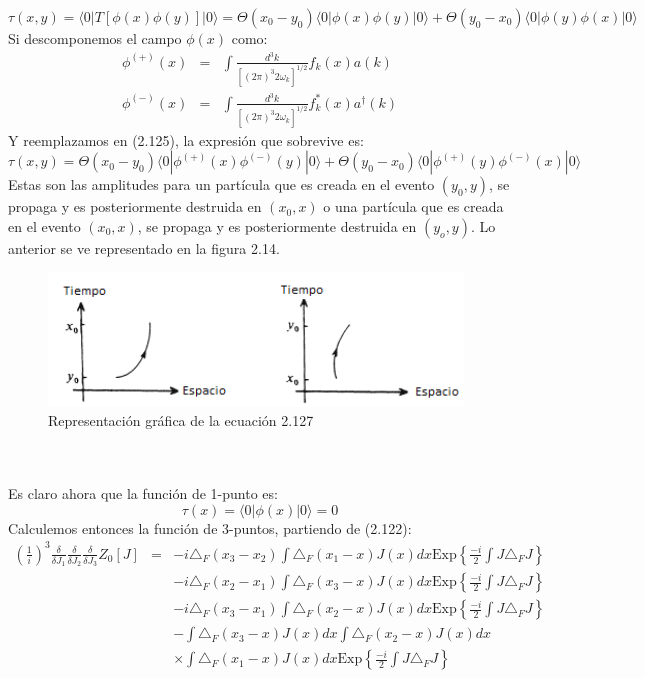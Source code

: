 \begin{equation}
\tau(x,y)=\langle0|T[\phi(x)\phi(y)]|0\rangle=\Theta(x_{0}-y_{0})\langle0|\phi(x)\phi(y)|0\rangle+\Theta(y_{0}-x_{0})\langle0|\phi(y)\phi(x)|0\rangle
\end{equation}          
Si descomponemos el campo $\phi(x)$ como:
\begin{eqnarray}
\phi^{(+)}(x)&=&\int\frac{d^{3}k}{[(2\pi)^{3}2\omega_{k}]^{1/2}}f_{k}(x)a(k)\\
\phi^{(-)}(x)&=&\int\frac{d^{3}k}{[(2\pi)^{3}2\omega_{k}]^{1/2}}f_{k}^*(x)a^\dagger(k)
\end{eqnarray}
Y reemplazamos en (2.125), la expresión que sobrevive es:
\begin{equation}
\tau(x,y)=\Theta(x_{0}-y_{0})\langle0|\phi^{(+)}(x)\phi^{(-)}(y)|0\rangle+\Theta(y_{0}-x_{0})\langle0|\phi^{(+)}(y)\phi^{(-)}(x)|0\rangle
\end{equation}
Estas son las amplitudes para un partícula que es creada en el evento $(y_0,y)$, se propaga y es posteriormente destruida en $(x_0,x)$ o una partícula que es creada en el evento $(x_0,x)$, se propaga y es posteriormente destruida en $(y_o,y)$. Lo anterior se ve representado en la figura 2.14.
\begin{figure}[h!]
\centering
\includegraphics[width=11cm]{Imagenes/Fig15}
\caption[Representación gráfica de la función de 2-puntos ]{Representación gráfica de la ecuación 2.127}
\end{figure}
\\
\\
Es claro ahora que la función de 1-punto es:
\begin{equation}
\tau(x)=\langle 0|\phi(x)|0\rangle=0
\end{equation}
Calculemos entonces la función de 3-puntos, partiendo de (2.122):
\begin{eqnarray}
\nonumber\left(\frac{1}{i}\right)^{3}\frac{\delta}{\delta J_{1}}\frac{\delta}{\delta J_{2}}\frac{\delta}{\delta J_{3}}Z_{0}[J]&=&-i\triangle_{F}(x_{3}-x_{2})\int\triangle_{F}(x_{1}-x)J(x)dx\text{Exp}\left\{ \frac{-i}{2}\int J\triangle_{F}J\right\}\\
\nonumber && -i\triangle_{F}(x_{2}-x_{1})\int\triangle_{F}(x_{3}-x)J(x)dx\text{Exp}\left\{ \frac{-i}{2}\int J\triangle_{F}J\right\}\\
\nonumber &&-i\triangle_{F}(x_{3}-x_{1})\int\triangle_{F}(x_{2}-x)J(x)dx\text{Exp}\left\{ \frac{-i}{2}\int J\triangle_{F}J\right\}\\
\nonumber &&-\int\triangle_{F}(x_{3}-x)J(x)dx\int\triangle_{F}(x_{2}-x)J(x)dx\\
&&\times\int\triangle_{F}(x_{1}-x)J(x)dx\text{Exp}\left\{ \frac{-i}{2}\int J\triangle_{F}J\right\}
\end{eqnarray}

